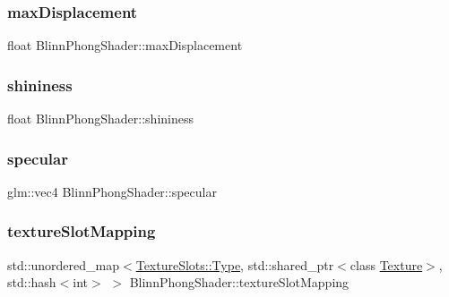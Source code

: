 \hypertarget{class_blinn_phong_shader_a9e5e58c4901d48b315e94d15fd504a8c}{}\label{class_blinn_phong_shader_a9e5e58c4901d48b315e94d15fd504a8c}
\subsubsection{\texorpdfstring{max\+Displacement}{maxDisplacement}}
{\footnotesize\ttfamily float Blinn\+Phong\+Shader\+::max\+Displacement\hspace{0.3cm}{\ttfamily [private]}}

\hypertarget{class_blinn_phong_shader_ad499c2389d7007ecb4c03d5270314933}{}\label{class_blinn_phong_shader_ad499c2389d7007ecb4c03d5270314933}
\subsubsection{\texorpdfstring{shininess}{shininess}}
{\footnotesize\ttfamily float Blinn\+Phong\+Shader\+::shininess\hspace{0.3cm}{\ttfamily [protected]}}

\hypertarget{class_blinn_phong_shader_a7adce7364e850b9f232e058956f809b8}{}\label{class_blinn_phong_shader_a7adce7364e850b9f232e058956f809b8}
\subsubsection{\texorpdfstring{specular}{specular}}
{\footnotesize\ttfamily glm\+::vec4 Blinn\+Phong\+Shader\+::specular\hspace{0.3cm}{\ttfamily [protected]}}

\hypertarget{class_blinn_phong_shader_a7467b1de2650fd04ea63ed5f8aeedc59}{}\label{class_blinn_phong_shader_a7467b1de2650fd04ea63ed5f8aeedc59}
\subsubsection{\texorpdfstring{texture\+Slot\+Mapping}{textureSlotMapping}}
{\footnotesize\ttfamily std\+::unordered\+\_\+map$<$\hyperlink{struct_blinn_phong_shader_1_1_texture_slots_a98940b49ba855ee47d61a6243c05c34d}{Texture\+Slots\+::\+Type}, std\+::shared\+\_\+ptr$<$class \hyperlink{class_texture}{Texture}$>$, std\+::hash$<$int$>$ $>$ Blinn\+Phong\+Shader\+::texture\+Slot\+Mapping\hspace{0.3cm}{\ttfamily [private]}}



